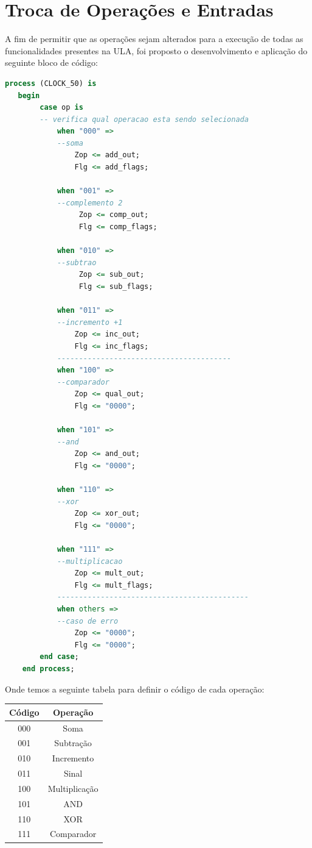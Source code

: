 \documentclass[a4paper, 12pt]{article}
\begin{document}
\section{Troca de Operações e Entradas}
A fim de permitir que as operações sejam alterados para a execução de todas as funcionalidades presentes na ULA, foi proposto o desenvolvimento e aplicação do seguinte bloco de código:
\begin{lstlisting}[language=VHDL]
process (CLOCK_50) is
   begin
		case op is
		-- verifica qual operacao esta sendo selecionada
			when "000" => 
			--soma
				Zop <= add_out;
				Flg <= add_flags;

			when "001" =>
			--complemento 2
				 Zop <= comp_out;
				 Flg <= comp_flags;

			when "010" =>
			--subtrao
				 Zop <= sub_out;
				 Flg <= sub_flags;

			when "011" =>
			--incremento +1
				Zop <= inc_out;
				Flg <= inc_flags;
			----------------------------------------
			when "100" =>
			--comparador
				Zop <= qual_out;
				Flg <= "0000";

			when "101" =>
			--and
				Zop <= and_out;
				Flg <= "0000";

			when "110" =>
			--xor
				Zop <= xor_out;
				Flg <= "0000";

			when "111" =>
			--multiplicacao
				Zop <= mult_out;
				Flg <= mult_flags;
			--------------------------------------------
			when others =>
			--caso de erro
				Zop <= "0000";
				Flg <= "0000";
        end case;
    end process;
\end{lstlisting}

Onde temos a seguinte tabela para definir o código de cada operação:

\begin{table}[htb]
\centering
\begin{tabular}{c|c}
Código & Operação \\ \hline
000	& Soma 		\\\hline
001 & Subtração	\\\hline
010 & Incremento \\\hline
011 & Sinal \\\hline
100 & Multiplicação \\\hline
101 & AND \\\hline
110 & XOR \\\hline
111 & Comparador
\end{tabular}
\label{vazio}
\end{table}
\end{document}
